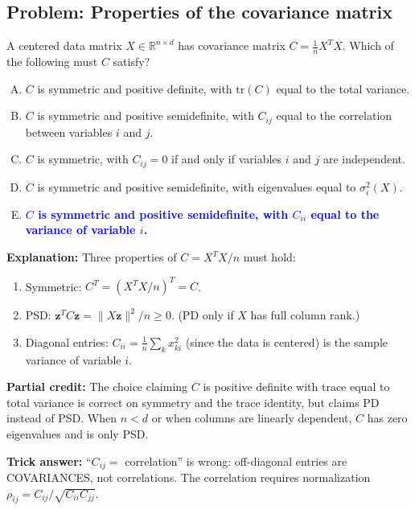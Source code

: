 \documentclass[12pt]{amsart}
\begin{document}
\subsection*{Problem: Properties of the covariance matrix}

A centered data matrix $X \in \mathbb{R}^{n \times d}$ has covariance matrix
$C = \frac{1}{n}X^TX$. Which of the following must $C$ satisfy?

\begin{enumerate}[(A)]
\item $C$ is symmetric and positive definite, with $\mathrm{tr}(C)$ equal to the total variance.
\item $C$ is symmetric and positive semidefinite, with $C_{ij}$ equal to the
correlation between variables $i$ and $j$.
\item $C$ is symmetric, with $C_{ij} = 0$ if and only if variables $i$ and $j$
are independent.
\item $C$ is symmetric and positive semidefinite, with eigenvalues equal to $\sigma_i^2(X)$.
\item \textcolor{blue}{\textbf{$C$ is symmetric and positive semidefinite, with $C_{ii}$ equal to the variance of variable $i$.}}
\end{enumerate}

\textbf{Explanation:}
Three properties of $C = X^TX/n$ must hold:
\begin{enumerate}[(1)]
\item Symmetric: $C^T = (X^TX/n)^T = C$.
\item PSD: $\mathbf{z}^TC\mathbf{z} = \|X\mathbf{z}\|^2/n \geq 0$.
(PD only if $X$ has full column rank.)
\item Diagonal entries: $C_{ii} = \tfrac{1}{n}\sum_{k} x_{ki}^2$
(since the data is centered) is the sample variance of variable $i$.
\end{enumerate}

\textbf{Partial credit:}
The choice claiming $C$ is positive definite with trace equal to total variance
is correct on symmetry and the trace identity, but claims PD instead of PSD.
When $n < d$ or when columns are linearly dependent, $C$ has zero eigenvalues
and is only PSD.

\textbf{Trick answer:}
``$C_{ij} =$ correlation'' is wrong: off-diagonal entries are COVARIANCES,
not correlations. The correlation requires normalization
$\rho_{ij} = C_{ij}/\sqrt{C_{ii}C_{jj}}$.
\end{document}
